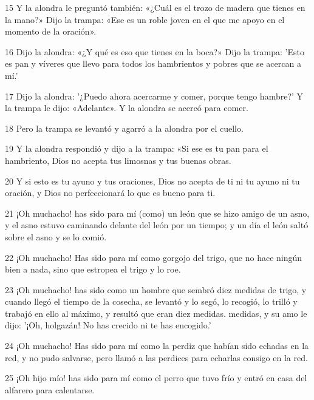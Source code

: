 \par 15 Y la alondra le preguntó también: «¿Cuál es el trozo de madera que tienes en la mano?» Dijo la trampa: «Ese es un roble joven en el que me apoyo en el momento de la oración».

\par 16 Dijo la alondra: «¿Y qué es eso que tienes en la boca?» Dijo la trampa: 'Esto es pan y víveres que llevo para todos los hambrientos y pobres que se acercan a mí.'

\par 17 Dijo la alondra: '¿Puedo ahora acercarme y comer, porque tengo hambre?' Y la trampa le dijo: «Adelante». Y la alondra se acercó para comer.

\par 18 Pero la trampa se levantó y agarró a la alondra por el cuello.

\par 19 Y la alondra respondió y dijo a la trampa: «Si ese es tu pan para el hambriento, Dios no acepta tus limosnas y tus buenas obras.

\par 20 Y si esto es tu ayuno y tus oraciones, Dios no acepta de ti ni tu ayuno ni tu oración, y Dios no perfeccionará lo que es bueno para ti.

\par 21 ¡Oh muchacho! has sido para mí (como) un león que se hizo amigo de un asno, y el asno estuvo caminando delante del león por un tiempo; y un día el león saltó sobre el asno y se lo comió.

\par 22 ¡Oh muchacho! Has sido para mí como gorgojo del trigo, que no hace ningún bien a nada, sino que estropea el trigo y lo roe.

\par 23 ¡Oh muchacho! has sido como un hombre que sembró diez medidas de trigo, y cuando llegó el tiempo de la cosecha, se levantó y lo segó, lo recogió, lo trilló y trabajó en ello al máximo, y resultó que eran diez medidas. medidas, y su amo le dijo: '¡Oh, holgazán! No has crecido ni te has encogido.'

\par 24 ¡Oh muchacho! Has sido para mí como la perdiz que habían sido echadas en la red, y no pudo salvarse, pero llamó a las perdices para echarlas consigo en la red.

\par 25 ¡Oh hijo mío! has sido para mí como el perro que tuvo frío y entró en casa del alfarero para calentarse.

